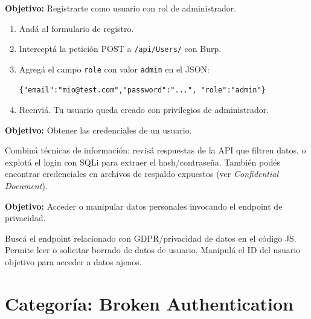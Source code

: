 \documentclass[11pt,a4paper]{article}
\begin{document}
\begin{desafio}
\textbf{Objetivo:} Registrarte como usuario con rol de administrador.
\begin{solucion}
\begin{enumerate}[leftmargin=*]
  \item Andá al formulario de registro.
  \item Interceptá la petición POST a \texttt{/api/Users/} con Burp.
  \item Agregá el campo \texttt{role} con valor \texttt{admin} en el JSON:
  \begin{lstlisting}
{"email":"mio@test.com","password":"...", "role":"admin"}
  \end{lstlisting}
  \item Reenviá. Tu usuario queda creado con privilegios de administrador.
\end{enumerate}
\end{solucion}
\end{desafio}

\begin{desafio}
\textbf{Objetivo:} Obtener las credenciales de un usuario.
\begin{solucion}
Combiná técnicas de información: revisá respuestas de la API que filtren datos, o explotá el login con SQLi para extraer el hash/contraseña. También podés encontrar credenciales en archivos de respaldo expuestos (ver \textit{Confidential Document}).
\end{solucion}
\end{desafio}

\begin{desafio}
\textbf{Objetivo:} Acceder o manipular datos personales invocando el endpoint de privacidad.
\begin{solucion}
Buscá el endpoint relacionado con GDPR/privacidad de datos en el código JS. Permite leer o solicitar borrado de datos de usuario. Manipulá el ID del usuario objetivo para acceder a datos ajenos.
\end{solucion}
\end{desafio}

\section{Categoría: Broken Authentication}
\end{document}
